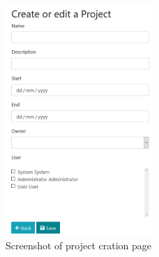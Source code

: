 \begin{figure}[H]
	\centering
	\includegraphics[width=0.5\textwidth]{Assets/implementation_shots/CreateProject.png}
	\caption{Screenshot of project cration page}
	\label{fig:ShotProjectCreation}
\end{figure}

